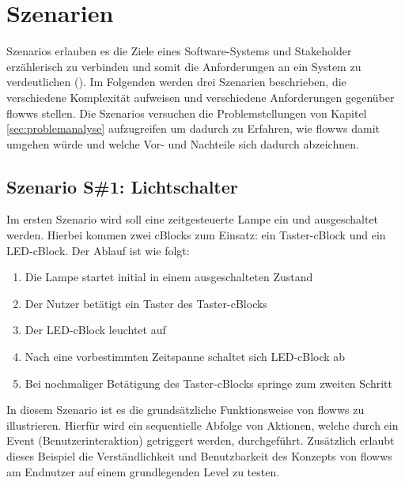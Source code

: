 \section{Szenarien}\label{sec:szenarien}
Szenarios erlauben es die Ziele eines Software-Systems und Stakeholder erzählerisch zu verbinden und somit die Anforderungen an ein System zu verdeutlichen (\cite{Lamsweerde2001scenario}). Im Folgenden werden drei Szenarien beschrieben, die verschiedene Komplexität aufweisen und verschiedene Anforderungen gegenüber flowws stellen. Die Szenarios versuchen die Problemstellungen von Kapitel \ref{sec:problemanalyse} aufzugreifen um dadurch zu Erfahren, wie flowws damit umgehen würde und welche Vor- und Nachteile sich dadurch abzeichnen. 

\subsection{Szenario S\#1: Lichtschalter}
Im ersten Szenario wird soll eine zeitgesteuerte Lampe ein und ausgeschaltet werden. Hierbei kommen zwei cBlocks zum Einsatz: ein Taster-cBlock und ein LED-cBlock. Der Ablauf ist wie folgt:
\begin{enumerate}
    \item Die Lampe startet initial in einem ausgeschalteten Zustand
    \item Der Nutzer betätigt ein Taster des Taster-cBlocks
    \item Der LED-cBlock leuchtet auf
    \item Nach eine vorbestimmten Zeitspanne schaltet sich LED-cBlock ab
    \item Bei nochmaliger Betätigung des Taster-cBlocks springe zum zweiten Schritt
\end{enumerate}
In diesem Szenario ist es die grundsätzliche Funktionsweise von flowws zu illustrieren. Hierfür wird ein sequentielle Abfolge von Aktionen, welche durch ein Event (Benutzerinteraktion) getriggert werden, durchgeführt. Zusätzlich erlaubt dieses Beispiel die Verständlichkeit und Benutzbarkeit des Konzepts von flowws am Endnutzer auf einem grundlegenden Level zu testen.

